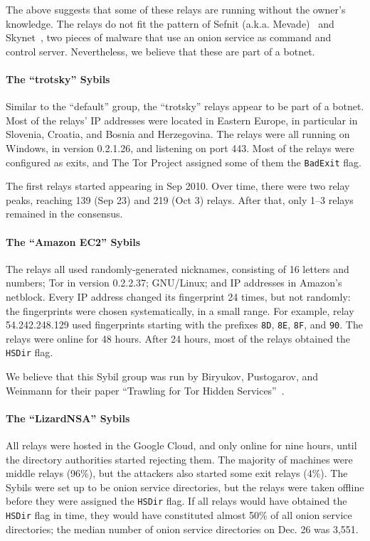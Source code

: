 The above suggests that some of these relays are running without the owner's
knowledge.  The relays do not fit the pattern of Sefnit (a.k.a.
Mevade)~\cite{sefnit} and Skynet~\cite{skynet}, two pieces of malware that use
an onion service as command and control server.  Nevertheless, we believe that
these are part of a botnet.

\paragraph{The ``trotsky'' Sybils}
Similar to the ``default'' group, the ``trotsky'' relays appear to be part of
a botnet.  Most of the relays' IP addresses were located in Eastern Europe, in
particular in Slovenia, Croatia, and Bosnia and Herzegovina.  The relays were
all running on Windows, in version 0.2.1.26, and listening on port 443.  Most of
the relays were configured as exits, and The Tor Project assigned some of them
the \texttt{BadExit} flag.

The first relays started appearing in Sep 2010.  Over time, there were two relay
peaks, reaching 139 (Sep 23) and 219 (Oct 3) relays.  After that, only 1--3
relays remained in the consensus.

\paragraph{The ``Amazon EC2'' Sybils}
The relays all used randomly-generated nicknames, consisting of 16 letters and
numbers; Tor in version 0.2.2.37; GNU/Linux; and IP addresses in Amazon's
netblock.  Every IP address changed its fingerprint 24 times, but not randomly:
the fingerprints were chosen systematically, in a small range.  For example,
relay 54.242.248.129 used fingerprints starting with the prefixes \texttt{8D},
\texttt{8E}, \texttt{8F}, and \texttt{90}.  The relays were online for 48 hours.
After 24 hours, most of the relays obtained the \texttt{HSDir} flag.

We believe that this Sybil group was run by Biryukov, Pustogarov, and Weinmann
for their paper ``Trawling for Tor Hidden Services''~\cite{Biryukov2013a}.

\paragraph{The ``LizardNSA'' Sybils}
All relays were hosted in the Google Cloud, and only online for nine hours,
until the directory authorities started rejecting them.  The majority of
machines were middle relays (96\%), but the attackers also started some exit
relays (4\%).  The Sybils were set up to be onion service directories, but the
relays were taken offline before they were assigned the \texttt{HSDir} flag.  If
all relays would have obtained the \texttt{HSDir} flag in time, they would have
constituted almost 50\% of all onion service directories; the median number of
onion service directories on Dec. 26 was 3,551.

